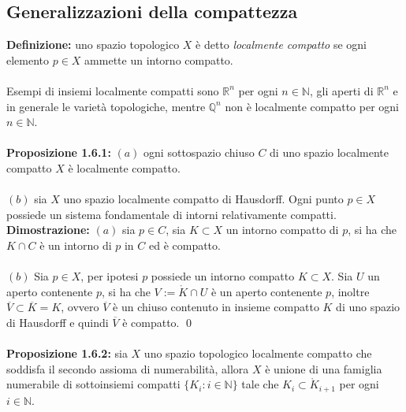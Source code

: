 \documentclass{article}
\begin{document}
\subsection{Generalizzazioni della compattezza}
\textbf{Definizione:} uno spazio topologico $X$ è detto \textit{localmente compatto} se ogni elemento $p \in X$ ammette un intorno compatto. \\ \\
Esempi di insiemi localmente compatti sono $\mathbb{R}^n$ per ogni $n \in \mathbb{N}$, gli aperti di $\mathbb{R}^n$ e in generale le varietà topologiche, mentre $\mathbb{Q}^n$ non è localmente compatto per ogni $n \in \mathbb{N}$. \\ \\
\textbf{Proposizione 1.6.1:} $(a)$ ogni sottospazio chiuso $C$ di uno spazio localmente compatto $X$ è localmente compatto. \\ \\
$(b)$ sia $X$ uno spazio localmente compatto di Hausdorff. Ogni punto $p \in X$ possiede un sistema fondamentale di intorni relativamente compatti. \\

\textbf{Dimostrazione:} $(a)$ sia $p \in C$, sia $K \subset X$ un intorno compatto di $p$, si ha che $K \cap C$ è un intorno di $p$ in $C$ ed è compatto. \\ \\
$(b)$ Sia $p \in X$, per ipotesi $p$ possiede un intorno compatto $K \subset X$. Sia $U$ un aperto contenente $p$, si ha che $V := \mathring{K} \cap U$ è un aperto contenente $p$, inoltre $\overline{V} \subset \overline{K} = K$, ovvero $\overline{V}$ è un chiuso contenuto in insieme compatto $K$ di uno spazio di Hausdorff e quindi $\overline{V}$ è compatto. \qed \\ \\
\textbf{Proposizione 1.6.2:} sia $X$ uno spazio topologico localmente compatto che soddisfa il secondo assioma di numerabilità, allora $X$ è unione di una famiglia numerabile di sottoinsiemi compatti $\{K_i : i \in \mathbb{N}\}$ tale che $K_i \subset \mathring{K}_{i + 1}$ per ogni $i \in \mathbb{N}$. \\
\end{document}
